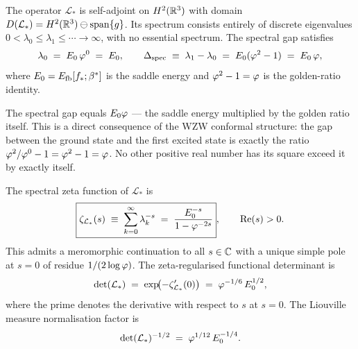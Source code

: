 \begin{theorem}
\label{P10:thm:selfadjoint}
The operator $\mathcal{L}_*$ is self-adjoint on $H^2(\mathbb{R}^3)$
with domain $D(\mathcal{L}_*) = H^2(\mathbb{R}^3)\ominus\mathrm{span}\{g\}$.
Its spectrum consists entirely of discrete eigenvalues
$0 < \lambda_0 \leq \lambda_1 \leq \cdots \to \infty$,
with no essential spectrum.
The spectral gap satisfies
\begin{equation}
  \lambda_0 \;=\; E_0\,\varphi^0 \;=\; E_0,
  \qquad
  \Delta_\mathrm{spec} \;\equiv\; \lambda_1 - \lambda_0
  \;=\; E_0(\varphi^2-1) \;=\; E_0\,\varphi,
  \label{P10:eq:spectral_gap}
\end{equation}
where $E_0 = E_{\mathrm{fb}}[f_*;\beta^{*}]$ is the saddle energy and
$\varphi^2 - 1 = \varphi$ is the golden-ratio identity.
\end{theorem}

\begin{remark}
\label{P10:rem:spectral_gap_golden}
The spectral gap equals $E_0\varphi$ --- the saddle energy multiplied by the
golden ratio itself.
This is a direct consequence of the WZW conformal structure:
the gap between the ground state and the first excited state is
exactly the ratio $\varphi^2/\varphi^0 - 1 = \varphi^2 - 1 = \varphi$.
No other positive real number has its square exceed it by exactly itself.
\end{remark}

\begin{theorem}
\label{P10:thm:spectral_zeta}
The spectral zeta function of $\mathcal{L}_*$ is
\begin{equation}
  \boxed{\zeta_{\mathcal{L}_*}(s)
  \;\equiv\; \sum_{k=0}^{\infty} \lambda_k^{-s}
  \;=\; \frac{E_0^{-s}}{1 - \varphi^{-2s}}},
  \qquad \mathrm{Re}(s) > 0.
  \label{P10:eq:zeta_exact}
\end{equation}
This admits a meromorphic continuation to all $s\in\mathbb{C}$ with a unique
simple pole at $s=0$ of residue $1/(2\log\varphi)$.
The zeta-regularised functional determinant is
\begin{equation}
  \det(\mathcal{L}_*) \;=\; \exp\!\bigl(-\zeta'_{\mathcal{L}_*}(0)\bigr)
  \;=\; \varphi^{-1/6}\,E_0^{1/2},
  \label{P10:eq:det_exact}
\end{equation}
where the prime denotes the derivative with respect to $s$ at $s=0$.
The Liouville measure normalisation factor is
\begin{equation}
  \det(\mathcal{L}_*)^{-1/2}
  \;=\; \varphi^{1/12}\,E_0^{-1/4}.
  \label{P10:eq:det_half}
\end{equation}
\end{theorem}

